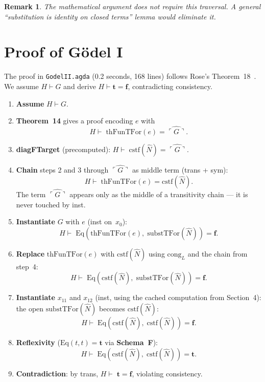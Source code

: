 \documentclass[11pt]{article}
\newtheorem{remark}[theorem]{Remark}
\newcommand{\true}{\mathbf{t}}
\newcommand{\false}{\mathbf{f}}
\newcommand{\SchemaF}{\textbf{Schema~F}}
\begin{document}
\begin{remark}
The mathematical argument does not require this traversal.
A general ``substitution is identity on closed terms'' lemma would
eliminate it.
\end{remark}

\section{Proof of G\"odel I}

The proof in \texttt{GodelII.agda} (0.2 seconds, 168 lines)
follows Rose's Theorem~18~\cite{rose1961}.
We assume $H \vdash G$ and derive $H \vdash \true = \false$,
contradicting consistency.

\begin{enumerate}
\item \textbf{Assume} $H \vdash G$.

\item \textbf{Theorem~14} gives a proof encoding $e$ with
  \[
    H \vdash\; \mathrm{thFunTFor}(e) = \widehat{\ulcorner G \urcorner}.
  \]

\item \textbf{diagFTarget} (precomputed):
  $H \vdash\; \mathrm{cstf}(\hat{N}) = \widehat{\ulcorner G \urcorner}$.

\item \textbf{Chain} steps 2 and 3 through
  $\widehat{\ulcorner G \urcorner}$ as middle term (trans + sym):
  \[
    H \vdash\; \mathrm{thFunTFor}(e) = \mathrm{cstf}(\hat{N}).
  \]
  The term $\widehat{\ulcorner G \urcorner}$ appears only as the
  middle of a transitivity chain --- it is never touched by inst.

\item \textbf{Instantiate} $G$ with $e$ (inst on~$x_0$):
  \[
    H \vdash\;
    \mathrm{Eq}(\mathrm{thFunTFor}(e),\;
    \mathrm{substTFor}(\hat{N})) = \false.
  \]

\item \textbf{Replace} $\mathrm{thFunTFor}(e)$ with
  $\mathrm{cstf}(\hat{N})$ using $\mathrm{cong}_L$ and the chain
  from step~4:
  \[
    H \vdash\;
    \mathrm{Eq}(\mathrm{cstf}(\hat{N}),\;
    \mathrm{substTFor}(\hat{N})) = \false.
  \]

\item \textbf{Instantiate} $x_{11}$ and $x_{12}$ (inst, using
  the cached computation from Section~4):
  the open $\mathrm{substTFor}(\hat{N})$ becomes
  $\mathrm{cstf}(\hat{N})$:
  \[
    H \vdash\;
    \mathrm{Eq}(\mathrm{cstf}(\hat{N}),\;
    \mathrm{cstf}(\hat{N})) = \false.
  \]

\item \textbf{Reflexivity} ($\mathrm{Eq}(t,t) = \true$ via \SchemaF):
  \[
    H \vdash\;
    \mathrm{Eq}(\mathrm{cstf}(\hat{N}),\;
    \mathrm{cstf}(\hat{N})) = \true.
  \]

\item \textbf{Contradiction}: by trans,
  $H \vdash\; \true = \false$, violating consistency.
\end{enumerate}
\end{document}
